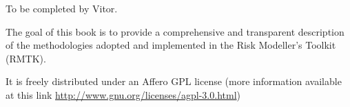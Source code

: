 To be completed by Vitor.

The goal of this book is to provide a comprehensive and transparent description
of the methodologies adopted and implemented in the Risk Modeller's Toolkit
(RMTK).

It is freely distributed under an Affero GPL license 
(more information available at this link 
\href{http://www.gnu.org/licenses/agpl-3.0.html}{http://www.gnu.org/licenses/agpl-3.0.html})